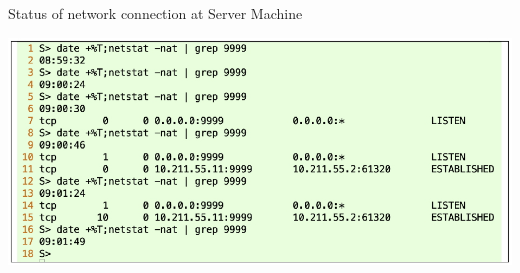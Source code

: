 \begin{table}[H]

\vspace{-.7cm}

\centering
\caption{Status of network connection at Server Machine}\label{tab03}
\includegraphics[scale=2.35]{src/Figures/chap1/tab03.jpg}
\end{table}

